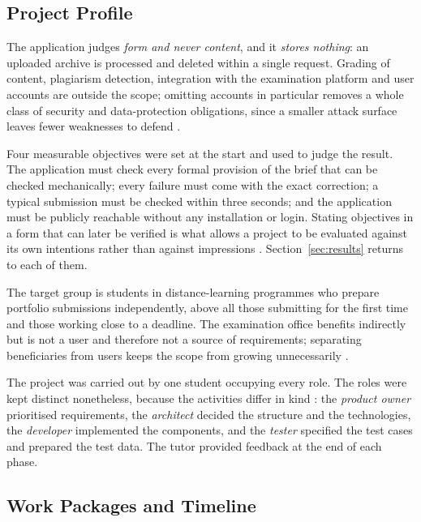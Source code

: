 \documentclass[a4paper,11pt]{article}
\begin{document}
\subsection{Project Profile}\label{sec:profile}

The application judges \textit{form and never content}, and it \textit{stores
nothing}: an uploaded archive is processed and deleted within a single request.
Grading of content, plagiarism detection, integration with the examination
platform and user accounts are outside the scope; omitting accounts in particular
removes a whole class of security and data-protection obligations, since a
smaller attack surface leaves fewer weaknesses to defend \citep{OWASP2021}.

Four measurable objectives were set at the start and used to judge the result.
The application must check every formal provision of the brief that can be
checked mechanically; every failure must come with the exact correction; a
typical submission must be checked within three seconds; and the application
must be publicly reachable without any installation or login. Stating objectives
in a form that can later be verified is what allows a project to be evaluated
against its own intentions rather than against impressions
\citep{Sommerville2020}. Section~\ref{sec:results} returns to each of them.

The target group is students in distance-learning programmes who prepare
portfolio submissions independently, above all those submitting for the first
time and those working close to a deadline. The examination office benefits
indirectly but is not a user and therefore not a source of requirements;
separating beneficiaries from users keeps the scope from growing unnecessarily
\citep{Sommerville2020}.

The project was carried out by one student occupying every role. The roles were
kept distinct nonetheless, because the activities differ in kind
\citep{Sommerville2020}: the \textit{product owner} prioritised requirements, the
\textit{architect} decided the structure and the technologies, the
\textit{developer} implemented the components, and the \textit{tester}
specified the test cases and prepared the test data. The tutor provided
feedback at the end of each phase.

\subsection{Work Packages and Timeline}\label{sec:plan}
\end{document}
